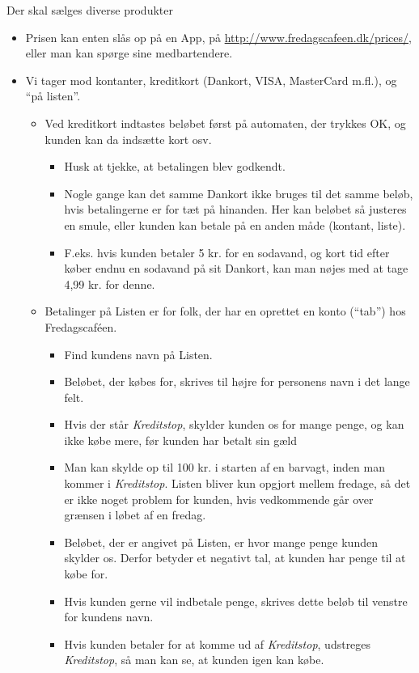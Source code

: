 Der skal sælges diverse produkter
\begin{itemize}
\item Prisen kan enten slås op på en App, på
  \url{http://www.fredagscafeen.dk/prices/}, eller man kan spørge
  sine medbartendere.
\item Vi tager mod kontanter, kreditkort (Dankort, VISA, MasterCard
  m.fl.), og ``på listen''.
  \begin{itemize}
  \item Ved kreditkort indtastes beløbet først på automaten, der
    trykkes OK, og kunden kan da indsætte kort osv.
    \begin{itemize}
    \item Husk at tjekke, at betalingen blev godkendt.
    \item Nogle gange kan det samme Dankort ikke bruges til det samme
      beløb, hvis betalingerne er for tæt på hinanden. Her kan beløbet
      så justeres en smule, eller kunden kan betale på en anden måde
      (kontant, liste).
    \item F.eks. hvis kunden betaler 5 kr. for en sodavand, og kort
      tid efter køber endnu en sodavand på sit Dankort, kan man nøjes
      med at tage 4,99 kr. for denne.
    \end{itemize}
  \item Betalinger på Listen er for folk, der har en oprettet en konto
    (``tab'') hos Fredagscaféen.
    \begin{itemize}
    \item Find kundens navn på Listen.
    \item Beløbet, der købes for, skrives til højre for personens navn
      i det lange felt.
    \item Hvis der står \emph{Kreditstop}, skylder kunden os for mange
      penge, og kan ikke købe mere, før kunden har betalt sin gæld
    \item Man kan skylde op til 100 kr. i starten af en barvagt, inden
      man kommer i \emph{Kreditstop}. Listen bliver kun opgjort mellem
      fredage, så det er ikke noget problem for kunden, hvis
      vedkommende går over grænsen i løbet af en fredag.
    \item Beløbet, der er angivet på Listen, er hvor mange penge
      kunden skylder os. Derfor betyder et negativt tal, at kunden har
      penge til at købe for.
    \item Hvis kunden gerne vil indbetale penge, skrives dette beløb
      til venstre for kundens navn.
    \item Hvis kunden betaler for at komme ud af \emph{Kreditstop},
      udstreges \emph{Kreditstop}, så man kan se, at kunden igen kan
      købe.
    \end{itemize}
  \end{itemize}
\end{itemize}

